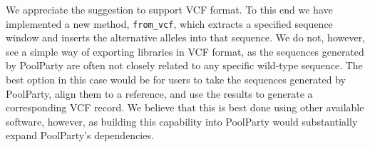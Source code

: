 \documentclass[11pt]{article}
\newenvironment{response}{\par\color{responseblue}}{\par}
\begin{document}
\begin{enumerate}
\begin{response}
We appreciate the suggestion to support VCF format. To this end we have implemented a new method, \texttt{from\_vcf}, which extracts a specified sequence window and inserts the alternative alleles into that sequence. We do not, however, see a simple way of exporting libraries in VCF format, as the sequences generated by PoolParty are often not closely related to any specific wild-type sequence. The best option in this case would be for users to take the sequences generated by PoolParty, align them to a reference, and use the results to generate a corresponding VCF record. We believe that this is best done using other available software, however, as building this capability into PoolParty would substantially expand PoolParty's dependencies.
\end{response}





\end{enumerate}
\end{document}
